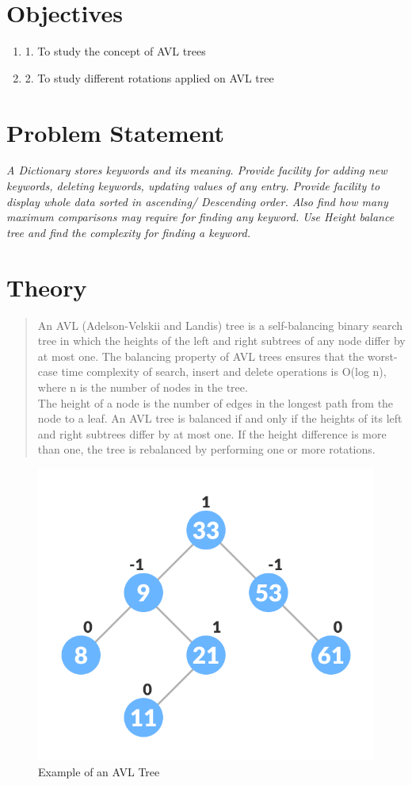 \documentclass[11pt]{article}
\begin{document}
\tableofcontents
\thispagestyle{empty}
\clearpage

\setcounter{page}{1}

\section{Objectives}
\begin{enumerate}
    \item 1. To study the concept of AVL trees
    \item 2. To study different rotations applied on AVL tree
\end{enumerate}

\section{Problem Statement}
\textit{A Dictionary stores keywords and its meaning. Provide facility for adding new keywords, deleting keywords, updating values of any entry. Provide facility to display whole data sorted in ascending/ Descending order. Also find how many maximum comparisons may require for finding any keyword. Use Height balance tree and find the complexity for finding a keyword.}
\section{Theory}
\begin{quotation}
    An AVL (Adelson-Velskii and Landis) tree is a self-balancing binary search tree in which the heights of the left and right subtrees of any node differ by at most one. The balancing property of AVL trees ensures that the worst-case time complexity of search, insert and delete operations is O(log n), where n is the number of nodes in the tree.\\

    The height of a node is the number of edges in the longest path from the node to a leaf. An AVL tree is balanced if and only if the heights of its left and right subtrees differ by at most one. If the height difference is more than one, the tree is rebalanced by performing one or more rotations.
\end{quotation}

\begin{figure}[H]
    \centering
    \includegraphics[width=.45\textwidth]{avl-tree-final-tree-1_0_2.png}
    \caption{Example of an AVL Tree}
\end{figure}
\end{document}
